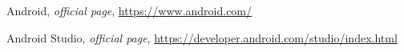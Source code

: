\begin{thebibliography}{99999}
\singlespace\normalsize

 Android, \textit{ official page}, \url{https://www.android.com/}

 Android Studio, \textit{ official page}, \url{https://developer.android.com/studio/index.html}

\end{thebibliography}
